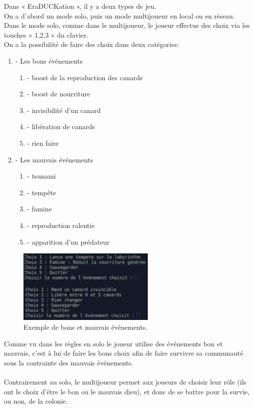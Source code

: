 \documentclass[12pt,a4paper,twoside]{article}
\begin{document}
Dans « EraDUCKation », il y a deux types de jeu.
\\
On a d'abord un mode solo, puis un mode multijoueur en local ou en réseau. 
\\
Dans le mode solo, comme dans le multijoueur, le joueur effectue des choix via les touches « 1,2,3 » du clavier.
\\
On a la possibilité de faire des choix dans deux catégories:
\begin{enumerate}
\item- Les bons événements
\begin{enumerate}
\item- boost de la reproduction des canards
\item- boost de nourriture
\item- invisibilité d'un canard
\item- libération de canards
\item- rien faire
\end{enumerate}
\item- Les mauvais événements
\begin{enumerate}
\item- tsunami
\item- tempête
\item- famine
\item- reproduction ralentie
\item- apparition d'un prédateur
\end{enumerate}
\end{enumerate}
\begin{figure}[h]
\centering
\includegraphics[width=0.6\textwidth]{IMG/event.png}
\caption{Exemple de bons et mauvais événements.}
\end{figure}
Comme vu dans les règles en solo le joueur utilise des événements bon et mauvais,
c'est à lui de faire les bons choix afin de faire survivre sa communauté sous la contrainte des mauvais événements.
\\ \\
Contrairement au solo, le multijoueur permet aux joueurs de choisir leur rôle (ils ont le choix d'être le bon ou le mauvais dieu), et donc de se battre pour la survie, ou non, de la colonie.
\end{document}
